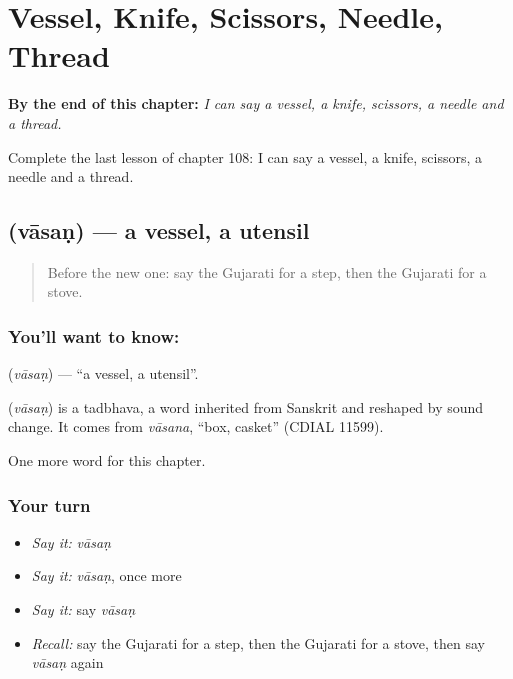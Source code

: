 
\chapter{Vessel, Knife, Scissors, Needle, Thread}
\label{ch:gu-vessel-knife-scissors-needle-thread}

\begin{chapteropening}
\textbf{By the end of this chapter:} \emph{I can say a vessel, a knife, scissors, a needle and a thread.}

Complete the last lesson of chapter 108: I can say a vessel, a knife, scissors, a needle and a thread.
\end{chapteropening}

\section[\texorpdfstring{\gu{વાસણ} (vāsaṇ)}{વાસણ (vāsaṇ)}]{ (vāsaṇ) — a vessel, a utensil}

\label{lesson:GU-C108-vasan}



\begin{quote}
Before the new one: say the Gujarati for a step, then the Gujarati for a stove.
\end{quote}

\subsection*{You'll want to know: }
\textbf{} (\emph{vāsaṇ}) — \textquotedblleft{}a vessel, a utensil\textquotedblright{}.

\begin{cousinweb}
\textbf{} (\emph{vāsaṇ}) is a tadbhava, a word inherited from Sanskrit and reshaped by sound change. It comes from \emph{vāsana}, \textquotedblleft{}box, casket\textquotedblright{} (CDIAL 11599).
\end{cousinweb}

\begin{grammarlens}[title={What you've built}]
One more word for this chapter.
\end{grammarlens}

\subsection*{Your turn}
\begin{itemize}
\raggedright
  \item \emph{Say it:} \emph{vāsaṇ}
  \item \emph{Say it:} \emph{vāsaṇ}, once more
  \item \emph{Say it:} say \emph{vāsaṇ}
  \item \emph{Recall:} say the Gujarati for a step, then the Gujarati for a stove, then say \emph{vāsaṇ} again
\end{itemize}

